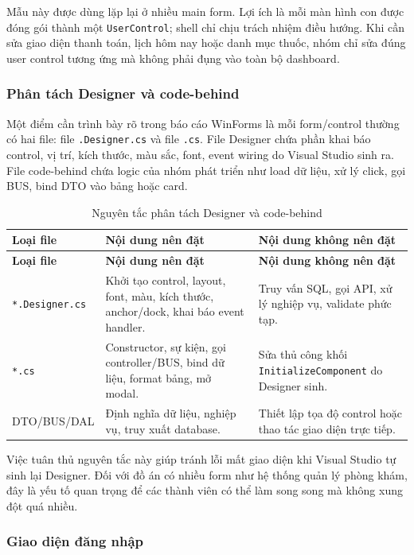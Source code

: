 \documentclass[12pt,a4paper]{article}
\numberwithin{figure}{subsection}
\numberwithin{table}{subsection}
\begin{document}
Mẫu này được dùng lặp lại ở nhiều main form. Lợi ích là mỗi màn hình con được đóng gói thành một \texttt{UserControl}; shell chỉ chịu trách nhiệm điều hướng. Khi cần sửa giao diện thanh toán, lịch hôm nay hoặc danh mục thuốc, nhóm chỉ sửa đúng user control tương ứng mà không phải đụng vào toàn bộ dashboard.

\subsubsection{Phân tách Designer và code-behind}

Một điểm cần trình bày rõ trong báo cáo WinForms là mỗi form/control thường có hai file: file \texttt{.Designer.cs} và file \texttt{.cs}. File Designer chứa phần khai báo control, vị trí, kích thước, màu sắc, font, event wiring do Visual Studio sinh ra. File code-behind chứa logic của nhóm phát triển như load dữ liệu, xử lý click, gọi BUS, bind DTO vào bảng hoặc card.

\begin{longtable}{|p{3.6cm}|p{5cm}|p{5.2cm}|}
\caption{Nguyên tắc phân tách Designer và code-behind} \\
\hline
\textbf{Loại file} & \textbf{Nội dung nên đặt} & \textbf{Nội dung không nên đặt} \\
\hline
\endfirsthead
\hline
\textbf{Loại file} & \textbf{Nội dung nên đặt} & \textbf{Nội dung không nên đặt} \\
\hline
\endhead
\texttt{*.Designer.cs} & Khởi tạo control, layout, font, màu, kích thước, anchor/dock, khai báo event handler. & Truy vấn SQL, gọi API, xử lý nghiệp vụ, validate phức tạp. \\
\hline
\texttt{*.cs} & Constructor, sự kiện, gọi controller/BUS, bind dữ liệu, format bảng, mở modal. & Sửa thủ công khối \texttt{InitializeComponent} do Designer sinh. \\
\hline
DTO/BUS/DAL & Định nghĩa dữ liệu, nghiệp vụ, truy xuất database. & Thiết lập tọa độ control hoặc thao tác giao diện trực tiếp. \\
\hline
\end{longtable}

Việc tuân thủ nguyên tắc này giúp tránh lỗi mất giao diện khi Visual Studio tự sinh lại Designer. Đối với đồ án có nhiều form như hệ thống quản lý phòng khám, đây là yếu tố quan trọng để các thành viên có thể làm song song mà không xung đột quá nhiều.

\subsubsection{Giao diện đăng nhập}
\end{document}

